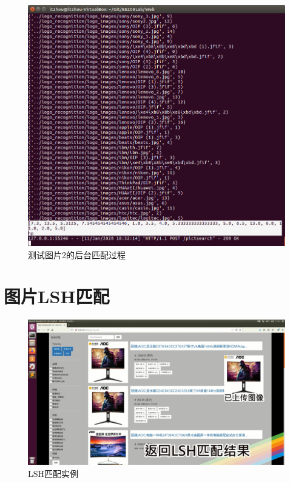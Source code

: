 \begin{figure}[htbp]
\centering
\includegraphics[width=14.5cm]{img/zlt/pictmatch2_2.png}
\caption{测试图片2的后台匹配过程}
\label{fig:zlt_pictmatch2_2}
\end{figure}

\section{图片LSH匹配}

\begin{figure}[htbp]
\centering
\includegraphics[width=14.5cm]{img/zlt/LSH.png}
\caption{LSH匹配实例}
\label{fig:zlt_LSH}
\end{figure}